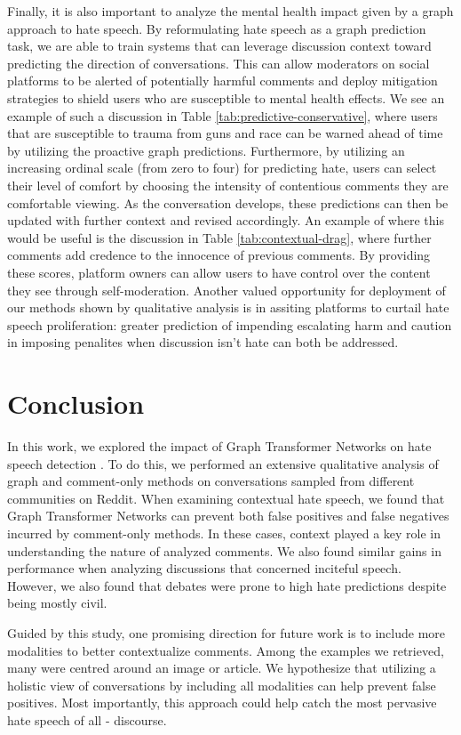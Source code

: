 \documentclass[letterpaper]{article} %
\newcommand{\edit}[1]{{#1}}
\begin{document}
Finally, it is also important to analyze the mental health impact given by a graph approach to hate speech. By reformulating hate speech as a graph prediction task, we are able to train systems that can leverage discussion context toward predicting the direction of conversations. This can allow moderators on social platforms to be alerted of potentially harmful comments and deploy mitigation strategies to shield users who are susceptible to mental health effects. We see an example of such a discussion in Table \ref{tab:predictive-conservative}, where users that are susceptible to trauma from guns and race can be warned ahead of time by utilizing the proactive graph predictions. Furthermore, by utilizing an increasing ordinal scale (from zero to four) for predicting hate, users can select their level of comfort by choosing the intensity of contentious comments they are comfortable viewing. As the conversation develops, these predictions can then be updated with further context and revised accordingly. An example of where this would be useful is the discussion in Table \ref{tab:contextual-drag}, where further comments add credence to the innocence of previous comments. \edit{By providing these scores, platform owners can allow users to have control over the content they see through self-moderation. Another valued opportunity for deployment of our methods shown by qualitative analysis is in assiting platforms to curtail hate speech proliferation: greater prediction of impending escalating harm and caution in imposing penalites when discussion isn't hate can both be addressed. }      
    
\section{Conclusion}
In this work, we explored the impact of Graph Transformer Networks on hate speech detection \cite{hebert2022predicting}. To do this, we performed an extensive qualitative analysis of graph and comment-only methods on conversations sampled from different communities on Reddit. When examining contextual hate speech, we found that Graph Transformer Networks can prevent both false positives and false negatives incurred by comment-only methods. In these cases, context played a key role in understanding the nature of analyzed comments. We also found similar gains in performance when analyzing discussions that concerned inciteful speech. However, we also found that debates were prone to high hate predictions despite being mostly civil. 

Guided by this study, one promising direction for future work is to include more modalities to better contextualize comments. Among the examples we retrieved, many were centred around an image or article. We hypothesize that utilizing a holistic view of conversations by including all modalities can help prevent false positives. Most importantly, this approach could help catch the most pervasive hate speech of all - discourse. 



\end{document}
